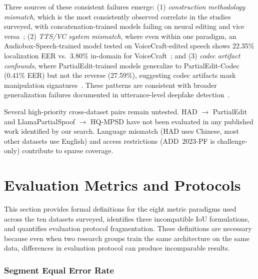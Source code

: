 \documentclass[journal]{IEEEtran}
\begin{document}
Three sources of these consistent failures emerge: (1) \emph{construction methodology mismatch}, which is the most consistently observed correlate in the studies surveyed, with concatenation-trained models failing on neural editing and vice versa~\cite{zhang2025partialedit}; (2) \emph{TTS/VC system mismatch}, where even within one paradigm, an Audiobox-Speech-trained model tested on VoiceCraft-edited speech shows 22.35\% localization EER vs.\ 3.80\% in-domain for VoiceCraft~\cite{zhang2025partialedit}; and (3) \emph{codec artifact confounds}, where PartialEdit-trained models generalize to PartialEdit-Codec (0.41\% EER) but not the reverse (27.59\%), suggesting codec artifacts mask manipulation signatures~\cite{zhang2025partialedit}. These patterns are consistent with broader generalization failures documented in utterance-level deepfake detection~\cite{muller2022does}.

Several high-priority cross-dataset pairs remain untested. HAD $\rightarrow$ PartialEdit and LlamaPartialSpoof $\rightarrow$ HQ-MPSD have not been evaluated in any published work identified by our search. Language mismatch (HAD uses Chinese, most other datasets use English) and access restrictions (ADD~2023-PF is challenge-only) contribute to sparse coverage.


\section{Evaluation Metrics and Protocols}
\label{sec:metrics}

This section provides formal definitions for the eight metric paradigms used across the ten datasets surveyed, identifies three incompatible IoU formulations, and quantifies evaluation protocol fragmentation. These definitions are necessary because even when two research groups train the same architecture on the same data, differences in evaluation protocol can produce incomparable results.



\subsubsection{Segment Equal Error Rate}
\label{sec:seg_eer}
\end{document}
